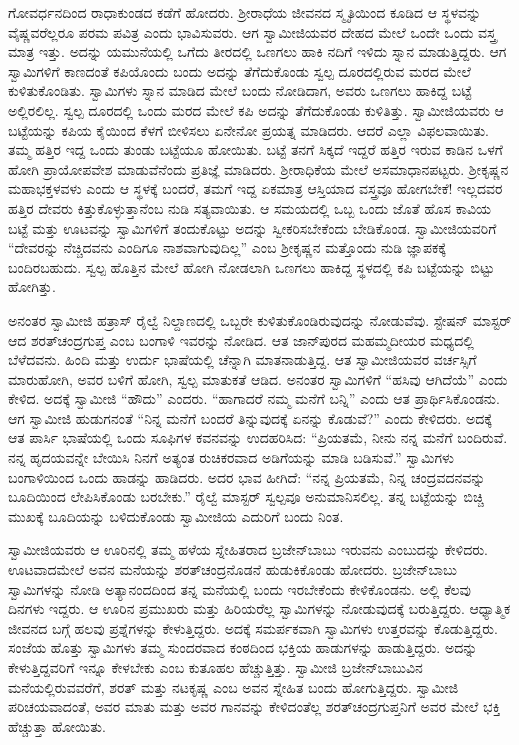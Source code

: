  ಗೋವರ್ಧನದಿಂದ ರಾಧಾಕುಂಡದ ಕಡೆಗೆ ಹೋದರು. ಶ‍್ರೀರಾಧೆಯ ಜೀವನದ ಸ್ಮೃತಿಯಿಂದ ಕೂಡಿದ ಆ ಸ್ಥಳವನ್ನು ವೈಷ್ಣವರೆಲ್ಲರೂ ಪರಮ ಪವಿತ್ರ ಎಂದು ಭಾವಿಸುವರು. ಆಗ ಸ್ವಾಮೀಜಿಯವರ ದೇಹದ ಮೇಲೆ ಒಂದೇ ಒಂದು ವಸ್ತ್ರ ಮಾತ್ರ ಇತ್ತು. ಅದನ್ನು ಯಮುನೆಯಲ್ಲಿ ಒಗೆದು ತೀರದಲ್ಲಿ ಒಣಗಲು ಹಾಕಿ ನದಿಗೆ ಇಳಿದು ಸ್ನಾನ ಮಾಡುತ್ತಿದ್ದರು. ಆಗ ಸ್ವಾಮಿಗಳಿಗೆ ಕಾಣದಂತೆ ಕಪಿಯೊಂದು ಬಂದು ಅದನ್ನು ತೆಗೆದುಕೊಂಡು ಸ್ವಲ್ಪ ದೂರದಲ್ಲಿರುವ ಮರದ ಮೇಲೆ ಕುಳಿತುಕೊಂಡಿತು. ಸ್ವಾಮಿಗಳು ಸ್ನಾನ ಮಾಡಿದ ಮೇಲೆ ಬಂದು ನೋಡಿದಾಗ, ಅವರು ಒಣಗಲು ಹಾಕಿದ್ದ ಬಟ್ಟೆ ಅಲ್ಲಿರಲಿಲ್ಲ. ಸ್ವಲ್ಪ ದೂರದಲ್ಲಿ ಒಂದು ಮರದ ಮೇಲೆ ಕಪಿ ಅದನ್ನು ತೆಗೆದುಕೊಂಡು ಕುಳಿತಿತ್ತು. ಸ್ವಾಮೀಜಿಯವರು ಆ ಬಟ್ಟೆಯನ್ನು ಕಪಿಯ ಕೈಯಿಂದ ಕೆಳಗೆ ಬೀಳಿಸಲು ಏನೇನೋ ಪ್ರಯತ್ನ ಮಾಡಿದರು. ಆದರೆ ಎಲ್ಲಾ ವಿಫಲವಾಯಿತು. ತಮ್ಮ ಹತ್ತಿರ ಇದ್ದ ಒಂದು ತುಂಡು ಬಟ್ಟೆಯೂ ಹೋಯಿತು. ಬಟ್ಟೆ ತನಗೆ ಸಿಕ್ಕದೆ ಇದ್ದರೆ ಹತ್ತಿರ ಇರುವ ಕಾಡಿನ ಒಳಗೆ ಹೋಗಿ ಪ್ರಾಯೋಪವೇಶ ಮಾಡುವೆನೆಂದು ಪ್ರತಿಜ್ಞೆ ಮಾಡಿದರು. ಶ‍್ರೀರಾಧಿಕೆಯ ಮೇಲೆ ಅಸಮಾಧಾನಪಟ್ಟರು. ಶ‍್ರೀಕೃಷ್ಣನ ಮಹಾಭಕ್ತಳವಳು ಎಂದು ಆ ಸ್ಥಳಕ್ಕೆ ಬಂದರೆ, ತಮಗೆ ಇದ್ದ ಏಕಮಾತ್ರ ಆಸ್ತಿಯಾದ ವಸ್ತ್ರವೂ ಹೋಗಬೇಕೆ! ಇಲ್ಲದವರ ಹತ್ತಿರ ದೇವರು ಕಿತ್ತುಕೊಳ್ಳುತ್ತಾನೆಂಬ ನುಡಿ ಸತ್ಯವಾಯಿತು. ಆ ಸಮಯದಲ್ಲಿ ಒಬ್ಬ ಒಂದು ಜೊತೆ ಹೊಸ ಕಾವಿಯ ಬಟ್ಟೆ ಮತ್ತು ಊಟವನ್ನು ಸ್ವಾಮಿಗಳಿಗೆ ತಂದುಕೊಟ್ಟು ಅದನ್ನು ಸ್ವೀಕರಿಸಬೇಕೆಂದು ಬೇಡಿಕೊಂಡ. ಸ್ವಾಮೀಜಿಯವರಿಗೆ “ದೇವರನ್ನು ನೆಚ್ಚಿದವನು ಎಂದಿಗೂ ನಾಶವಾಗುವುದಿಲ್ಲ” ಎಂಬ ಶ‍್ರೀಕೃಷ್ಣನ ಮತ್ತೊಂದು ನುಡಿ ಜ್ಞಾಪಕಕ್ಕೆ ಬಂದಿರಬಹುದು. ಸ್ವಲ್ಪ ಹೊತ್ತಿನ ಮೇಲೆ ಹೋಗಿ ನೋಡಲಾಗಿ ಒಣಗಲು ಹಾಕಿದ್ದ ಸ್ಥಳದಲ್ಲಿ ಕಪಿ ಬಟ್ಟೆಯನ್ನು ಬಿಟ್ಟು ಹೋಗಿತ್ತು. 

 ಅನಂತರ ಸ್ವಾಮೀಜಿ ಹತ್ರಾಸ್ ರೈಲ್ವೆ ನಿಲ್ದಾಣದಲ್ಲಿ ಒಬ್ಬರೇ ಕುಳಿತುಕೊಂಡಿರುವುದನ್ನು ನೋಡುವೆವು. ಸ್ಟೇಷನ್ ಮಾಸ್ಟರ್ ಆದ ಶರತ್‍ಚಂದ್ರಗುಪ್ತ ಎಂಬ ಬಂಗಾಳಿ ಇವರನ್ನು ನೋಡಿದ. ಆತ ಜಾನ್‍ಪುರದ ಮಹಮ್ಮದೀಯರ ಮಧ್ಯದಲ್ಲಿ ಬೆಳೆದವನು. ಹಿಂದಿ ಮತ್ತು ಉರ್ದು ಭಾಷೆಯಲ್ಲಿ ಚೆನ್ನಾಗಿ ಮಾತನಾಡುತ್ತಿದ್ದ. ಆತ ಸ್ವಾಮೀಜಿಯವರ ವರ್ಚಸ್ಸಿಗೆ ಮಾರುಹೋಗಿ, ಅವರ ಬಳಿಗೆ ಹೋಗಿ, ಸ್ವಲ್ಪ ಮಾತುಕತೆ ಆಡಿದ. ಅನಂತರ ಸ್ವಾಮಿಗಳಿಗೆ “ಹಸಿವು ಆಗಿದೆಯೆ” ಎಂದು ಕೇಳಿದ. ಅದಕ್ಕೆ ಸ್ವಾಮೀಜಿ “ಹೌದು” ಎಂದರು. “ಹಾಗಾದರೆ ನಮ್ಮ ಮನೆಗೆ ಬನ್ನಿ” ಎಂದು ಆತ ಪ್ರಾರ್ಥಿಸಿಕೊಂಡನು. ಆಗ ಸ್ವಾಮೀಜಿ ಹುಡುಗನಂತೆ “ನಿನ್ನ ಮನೆಗೆ ಬಂದರೆ ತಿನ್ನುವುದಕ್ಕೆ ಏನನ್ನು ಕೊಡುವೆ?” ಎಂದು ಕೇಳಿದರು. ಅದಕ್ಕೆ ಆತ ಪಾರ್ಸಿ ಭಾಷೆಯಲ್ಲಿ ಒಂದು ಸೂಫಿಗಳ ಕವನವನ್ನು ಉದಹರಿಸಿದ: “ಪ್ರಿಯತಮೆ, ನೀನು ನನ್ನ ಮನೆಗೆ ಬಂದಿರುವೆ. ನನ್ನ ಹೃದಯವನ್ನೇ ಬೇಯಿಸಿ ನಿನಗೆ ಅತ್ಯಂತ ರುಚಿಕರವಾದ ಅಡಿಗೆಯನ್ನು ಮಾಡಿ ಬಡಿಸುವೆ.” ಸ್ವಾಮಿಗಳು ಬಂಗಾಳಿಯಿಂದ ಒಂದು ಹಾಡನ್ನು ಹಾಡಿದರು. ಅದರ ಭಾವ ಹೀಗಿದೆ: “ನನ್ನ ಪ್ರಿಯತಮೆ, ನಿನ್ನ ಚಂದ್ರವದನವನ್ನು ಬೂದಿಯಿಂದ ಲೇಪಿಸಿಕೊಂಡು ಬರಬೇಕು.” ರೈಲ್ವೆ ಮಾಸ್ಟರ್ ಸ್ವಲ್ಪವೂ ಅನುಮಾನಿಸಲಿಲ್ಲ. ತನ್ನ ಬಟ್ಟೆಯನ್ನು ಬಿಚ್ಚಿ ಮುಖಕ್ಕೆ ಬೂದಿಯನ್ನು ಬಳಿದುಕೊಂಡು ಸ್ವಾಮೀಜಿಯ ಎದುರಿಗೆ ಬಂದು ನಿಂತ. 

 ಸ್ವಾಮೀಜಿಯವರು ಆ ಊರಿನಲ್ಲಿ ತಮ್ಮ ಹಳೆಯ ಸ್ನೇಹಿತರಾದ ಬ್ರಜೇನ್‍ಬಾಬು ಇರುವನು ಎಂಬುದನ್ನು ಕೇಳಿದರು. ಊಟವಾದಮೇಲೆ ಅವನ ಮನೆಯನ್ನು ಶರತ್‍ಚಂದ್ರನೊಡನೆ ಹುಡುಕಿಕೊಂಡು ಹೋದರು. ಬ್ರಜೇನ್‍ಬಾಬು ಸ್ವಾಮಿಗಳನ್ನು ನೋಡಿ ಅತ್ಯಾನಂದದಿಂದ ತನ್ನ ಮನೆಯಲ್ಲಿ ಬಂದು ಇರಬೇಕೆಂದು ಕೇಳಿಕೊಂಡನು. ಅಲ್ಲಿ ಕೆಲವು ದಿನಗಳು ಇದ್ದರು. ಆ ಊರಿನ ಪ್ರಮುಖರು ಮತ್ತು ಹಿರಿಯರೆಲ್ಲ ಸ್ವಾಮಿಗಳನ್ನು ನೋಡುವುದಕ್ಕೆ ಬರುತ್ತಿದ್ದರು. ಆಧ್ಯಾತ್ಮಿಕ ಜೀವನದ ಬಗ್ಗೆ ಹಲವು ಪ್ರಶ್ನೆಗಳನ್ನು ಕೇಳುತ್ತಿದ್ದರು. ಅದಕ್ಕೆ ಸಮರ್ಪಕವಾಗಿ ಸ್ವಾಮಿಗಳು ಉತ್ತರವನ್ನು ಕೊಡುತ್ತಿದ್ದರು. ಸಂಜೆಯ ಹೊತ್ತು ಸ್ವಾಮಿಗಳು ತಮ್ಮ ಸುಂದರವಾದ ಕಂಠದಿಂದ ಭಕ್ತಿಯ ಹಾಡುಗಳನ್ನು ಹಾಡುತ್ತಿದ್ದರು. ಅದನ್ನು ಕೇಳುತ್ತಿದ್ದವರಿಗೆ ಇನ್ನೂ ಕೇಳಬೇಕು ಎಂಬ ಕುತೂಹಲ ಹೆಚ್ಚುತ್ತಿತ್ತು. ಸ್ವಾಮೀಜಿ ಬ್ರಜೇನ್‍ಬಾಬುವಿನ ಮನೆಯಲ್ಲಿರುವವರೆಗೆ, ಶರತ್ ಮತ್ತು ನಟಕೃಷ್ಣ ಎಂಬ ಅವನ ಸ್ನೇಹಿತ ಬಂದು ಹೋಗುತ್ತಿದ್ದರು. ಸ್ವಾಮೀಜಿ ಪರಿಚಯವಾದಂತೆ, ಅವರ ಮಾತು ಮತ್ತು ಅವರ ಗಾನವನ್ನು ಕೇಳಿದಂತೆಲ್ಲ ಶರತ್‍ಚಂದ್ರಗುಪ್ತನಿಗೆ ಅವರ ಮೇಲೆ ಭಕ್ತಿ ಹೆಚ್ಚುತ್ತಾ ಹೋಯಿತು. 

